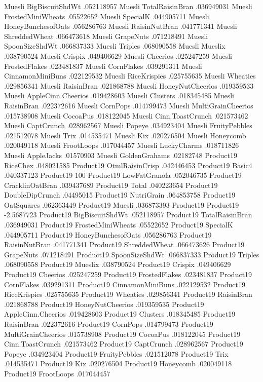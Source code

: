 Muesli	BigBiscuitShdWt	.052118957
Muesli	TotalRaisinBran	.036949031
Muesli	FrostedMiniWheats	.05522652
Muesli	SpecialK	.044905711
Muesli	HoneyBunchesofOats	.056286763
Muesli	RaisinNutBran	.041771341
Muesli	ShreddedWheat	.066473618
Muesli	GrapeNuts	.071218491
Muesli	SpoonSizeShdWt	.066837333
Muesli	Triples	.068090558
Muesli	Mueslix	.038790524
Muesli	Crispix	.049406629
Muesli	Cheerios	.025247259
Muesli	FrostedFlakes	.023481837
Muesli	CornFlakes	.039291311
Muesli	CinnamonMiniBuns	.022129532
Muesli	RiceKrispies	.025755635
Muesli	Wheaties	.029856341
Muesli	RaisinBran	.021868788
Muesli	HoneyNutCheerios	.019359533
Muesli	AppleCinn.Cheerios	.019428603
Muesli	Clusters	.018345485
Muesli	RaisinBran	.022372616
Muesli	CornPops	.014799473
Muesli	MultiGrainCheerios	.015738908
Muesli	CocoaPus	.018122045
Muesli	Cinn.ToastCrunch	.021573462
Muesli	CaptCrunch	.028962567
Muesli	Popeye	.034923404
Muesli	FruityPebbles	.021512078
Muesli	Trix	.014535471
Muesli	Kix	.020276504
Muesli	Honeycomb	.020049118
Muesli	FrootLoops	.017044457
Muesli	LuckyCharms	.018711826
Muesli	AppleJacks	.01570903
Muesli	GoldenGrahams	.02182748
Product19	RiceChex	.048021585
Product19	OtmlRaisinCrisp	.042446453
Product19	Basic4	.040337123
Product19	100%
Product19	LowFatGranola	.052046735
Product19	CracklinOatBran	.039437689
Product19	Total	.040223654
Product19	DoubleDipCrunch	.04495015
Product19	NutriGrain	.064853758
Product19	OatSquares	.062363449
Product19	Muesli	.036873393
Product19	Product19	-2.5687723
Product19	BigBiscuitShdWt	.052118957
Product19	TotalRaisinBran	.036949031
Product19	FrostedMiniWheats	.05522652
Product19	SpecialK	.044905711
Product19	HoneyBunchesofOats	.056286763
Product19	RaisinNutBran	.041771341
Product19	ShreddedWheat	.066473626
Product19	GrapeNuts	.071218491
Product19	SpoonSizeShdWt	.066837333
Product19	Triples	.068090558
Product19	Mueslix	.038790524
Product19	Crispix	.049406629
Product19	Cheerios	.025247259
Product19	FrostedFlakes	.023481837
Product19	CornFlakes	.039291311
Product19	CinnamonMiniBuns	.022129532
Product19	RiceKrispies	.025755635
Product19	Wheaties	.029856341
Product19	RaisinBran	.021868788
Product19	HoneyNutCheerios	.019359535
Product19	AppleCinn.Cheerios	.019428603
Product19	Clusters	.018345485
Product19	RaisinBran	.022372616
Product19	CornPops	.014799473
Product19	MultiGrainCheerios	.015738908
Product19	CocoaPus	.018122045
Product19	Cinn.ToastCrunch	.021573462
Product19	CaptCrunch	.028962567
Product19	Popeye	.034923404
Product19	FruityPebbles	.021512078
Product19	Trix	.014535471
Product19	Kix	.020276504
Product19	Honeycomb	.020049118
Product19	FrootLoops	.017044457

